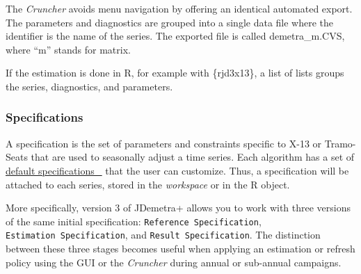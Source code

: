 \documentclass[
  letterpaper,
  DIV=11,
  numbers=noendperiod]{scrreprt}
\newenvironment{Shaded}{\begin{snugshade}}{\end{snugshade}}
\newcommand{\FunctionTok}[1]{\textcolor[rgb]{0.28,0.35,0.67}{#1}}
\newcommand{\NormalTok}[1]{\textcolor[rgb]{0.00,0.23,0.31}{#1}}
\newcommand{\OtherTok}[1]{\textcolor[rgb]{0.00,0.23,0.31}{#1}}
\newcommand{\SpecialCharTok}[1]{\textcolor[rgb]{0.37,0.37,0.37}{#1}}
\newcommand{\StringTok}[1]{\textcolor[rgb]{0.13,0.47,0.30}{#1}}
\begin{document}
The \emph{Cruncher} avoids menu navigation by offering an identical
automated export. The parameters and diagnostics are grouped into a
single data file where the identifier is the name of the series. The
exported file is called demetra\_m.CVS, where ``m'' stands for matrix.

If the estimation is done in R, for example with \{rjd3x13\}, a list of
lists groups the series, diagnostics, and parameters.

\begin{Shaded}
\end{Shaded}

\hypertarget{sec-concept-specification}{%
\subsubsection*{Specifications}\label{sec-concept-specification}}

A specification is the set of parameters and constraints specific to
X-13 or Tramo-Seats that are used to seasonally adjust a time series.
Each algorithm has a set of
\href{https://doc.jdemetra.org/a-sa-pre-treatment\#a-pre-t-def-spec}{default
specifications~🔗} that the user can customize. Thus, a specification
will be attached to each series, stored in the \emph{workspace} or in
the R object.

More specifically, version 3 of JDemetra+ allows you to work with three
versions of the same initial specification:
\texttt{Reference\ Specification}, \texttt{Estimation\ Specification},
and \texttt{Result\ Specification}. The distinction between these three
stages becomes useful when applying an estimation or refresh policy
using the GUI or the \emph{Cruncher} during annual or sub-annual
campaigns.
\end{document}
